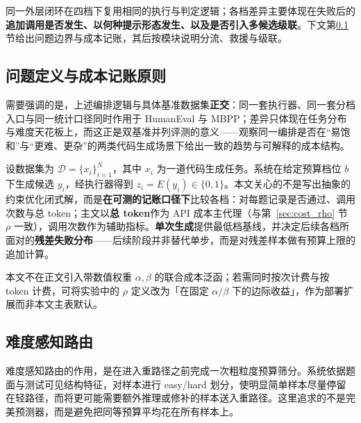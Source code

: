 同一外层闭环在四档下复用相同的执行与判定逻辑；各档差异主要体现在失败后的\textbf{追加调用是否发生、以何种提示形态发生、以及是否引入多候选级联}。下文第\ref{sec:formal-objective}节给出问题边界与成本记账，其后按模块说明分流、救援与级联。

\subsection{问题定义与成本记账原则}
\label{sec:formal-objective}

需要强调的是，上述编排逻辑与具体基准数据集\textbf{正交}：同一套执行器、同一套分档入口与同一统计口径同时作用于 HumanEval 与 MBPP；差异只体现在任务分布与难度天花板上，而这正是双基准并列评测的意义——观察同一编排是否在“易饱和”与“更难、更杂”的两类代码生成场景下给出一致的趋势与可解释的成本结构。

设数据集为 $\mathcal{D}=\{x_i\}_{i=1}^{N}$，其中 $x_i$ 为一道代码生成任务。系统在给定预算档位 $b$ 下生成候选 $y_i$，经执行器得到 $z_i=E(y_i)\in\{0,1\}$。本文关心的不是写出抽象的约束优化闭式解，而是\textbf{在可测的记账口径下}比较各档：对每题记录是否通过、调用次数与总 token；主文以\textbf{总 token}作为 API 成本主代理（与第~\ref{sec:cost_rho} 节 $\rho$ 一致），调用次数作为辅助指标。\textbf{单次生成}提供最低档基线，并决定后续各档所面对的\textbf{残差失败分布}——后续阶段并非替代单步，而是对残差样本做有预算上限的追加计算。

本文不在正文引入带数值权重 $\alpha,\beta$ 的联合成本泛函；若需同时按次计费与按 token 计费，可将实验中的 $\rho$ 定义改为「在固定 $\alpha/\beta$ 下的边际收益」，作为部署扩展而非本文主表默认。

\subsection{难度感知路由}
\label{sec:routing}

难度感知路由的作用，是在进入重路径之前完成一次粗粒度预算筛分。系统依据题面与测试可见结构特征，对样本进行 easy/hard 划分，使明显简单样本尽量停留在轻路径，而将更可能需要额外推理或修补的样本送入重路径。这里追求的不是完美预测器，而是避免把同等预算平均花在所有样本上。

